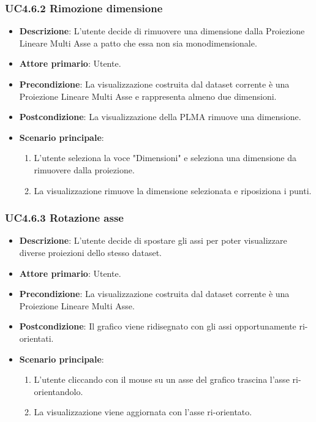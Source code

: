 \subsubsection{UC4.6.2 Rimozione dimensione}
\label{ssub:uc4.6.2}
\begin{itemize}
    \item \textbf{Descrizione}: L’utente decide di rimuovere una dimensione dalla Proiezione Lineare Multi Asse
                                a patto che essa non sia monodimensionale.

    \item \textbf{Attore primario}: Utente.
    
    \item \textbf{Precondizione}:   La visualizzazione costruita dal dataset corrente è una Proiezione Lineare Multi Asse
                                    e rappresenta almeno due dimensioni.
    \item \textbf{Postcondizione}:  La visualizzazione della PLMA rimuove una dimensione.

	\item \textbf{Scenario principale}:
        \begin{enumerate}
            \item L'utente seleziona la voce "Dimensioni" e seleziona una dimensione da rimuovere dalla proiezione.
            \item La visualizzazione rimuove la dimensione selezionata e riposiziona i punti.
           
        \end{enumerate}
\end{itemize}

\subsubsection{UC4.6.3 Rotazione asse}
\label{ssub:uc4.6.3}
\begin{itemize}
    \item \textbf{Descrizione}: L'utente decide di spostare gli assi per poter visualizzare diverse proiezioni dello stesso dataset.
    \item \textbf{Attore primario}: Utente.
    \item \textbf{Precondizione}: La visualizzazione costruita dal dataset corrente è una Proiezione Lineare Multi Asse.
    \item \textbf{Postcondizione}: Il grafico viene ridisegnato con gli assi opportunamente ri-orientati.
    \item \textbf{Scenario principale}:
    \begin{enumerate}
        \item L'utente cliccando con il mouse su un asse del grafico trascina l'asse ri-orientandolo.
	\item La visualizzazione viene aggiornata con l'asse ri-orientato.
    \end{enumerate}
\end{itemize}


